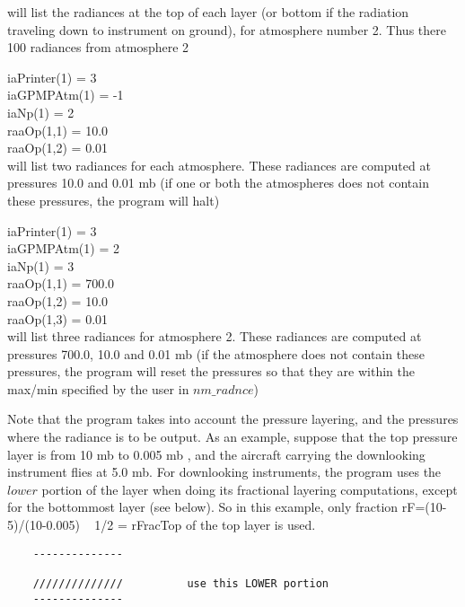 \documentclass[12pt]{article}
\newcommand{\ttab}{\indent\indent}
\begin{document}
{{\medskip\noindent 
will list the radiances at the top of each layer (or bottom if the
radiation traveling down to instrument on ground), for atmosphere
number 2.  Thus there 100 radiances from atmosphere 2

\medskip
\ttab iaPrinter(1) = 3\\
\ttab iaGPMPAtm(1) = -1\\
\ttab iaNp(1)      = 2\\
\ttab raaOp(1,1)   = 10.0\\
\ttab raaOp(1,2)   = 0.01\\

\medskip\noindent 
will list two radiances for each atmosphere.  These radiances are
computed at pressures 10.0 and 0.01 mb (if one or both the
atmospheres does not contain these pressures, the program will halt)

\medskip
\ttab iaPrinter(1) = 3\\
\ttab iaGPMPAtm(1) = 2\\
\ttab iaNp(1)      = 3\\
\ttab raaOp(1,1)   = 700.0\\
\ttab raaOp(1,2)   = 10.0\\
\ttab raaOp(1,3)   = 0.01\\

\medskip\noindent 
will list three radiances for atmosphere 2.  These radiances are
computed at pressures 700.0, 10.0 and 0.01 mb (if the atmosphere
does not contain these pressures, the program will reset the
pressures so that they are within the max/min specified by the user
in $nm\_radnce$)

Note that the program takes into account the pressure layering, and the 
pressures where the radiance is to be output. As an example, suppose that
the top pressure layer is from 10 mb to 0.005 mb , and the aircraft carrying 
the downlooking instrument flies at 5.0 mb. For downlooking instruments, 
the program uses the $lower$ portion of the layer when doing its fractional
layering computations, except for the bottommost layer (see below). 
So in this example, only fraction rF=(10-5)/(10-0.005) ~ 1/2 = rFracTop of 
the top layer is used.

\begin{verbatim}
    --------------

    //////////////          use this LOWER portion
    --------------
\end{verbatim}

}}
\end{document}

